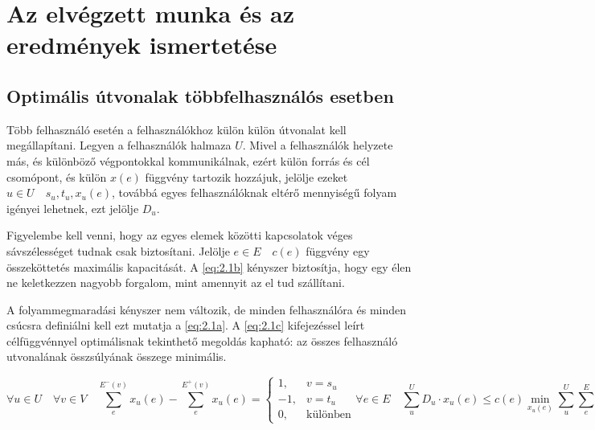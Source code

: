 \documentclass[a4paper,oneside]{article}
\newcommand{\inedge}[1]{E^-(#1)}
\newcommand{\outedge}[1]{E^+(#1)}
\begin{document}
\section{Az elvégzett munka és az eredmények ismertetése}
\label{sec:az-elvegzett-munka}

\subsection{Optimális útvonalak többfelhasználós esetben}
\label{sec:multiuser}

Több felhasználó esetén a felhasználókhoz külön külön útvonalat kell megállapítani.
Legyen a felhasználók halmaza $U$.
Mivel a felhasználók helyzete más, és különböző végpontokkal kommunikálnak, ezért külön forrás és cél csomópont, 
és külön $x(e)$ függvény tartozik hozzájuk, jelölje ezeket $u \in U \quad s_u, t_u, x_u(e)$,
továbbá egyes felhasználóknak eltérő mennyiségű folyam igényei lehetnek, ezt jelölje $D_u$.

Figyelembe kell venni, hogy az egyes elemek közötti kapcsolatok véges sávszélességet tudnak csak biztosítani.
Jelölje $e \in E \quad c(e)$ függvény egy összeköttetés maximális kapacitását.
A \eqref{eq:2.1b} kényszer biztosítja, hogy egy élen ne keletkezzen nagyobb forgalom, mint amennyit az el tud szállítani.

A folyammegmaradási kényszer nem változik, de minden felhasználóra és minden csúcsra definiálni kell ezt mutatja a \eqref{eq:2.1a}.
A \eqref{eq:2.1c} kifejezéssel leírt célfüggvénnyel optimálisnak tekinthető megoldás kapható:
az összes felhasználó utvonalának összsúlyának összege minimális.

\begin{subequations}
  \begin{equation}
    \forall u \in U \quad \forall v \in V \quad \sum_{e}^{\inedge{v}}x_u(e) - \sum_{e}^{\outedge{v}}x_u(e) = \begin{cases}
      1, & v = s_u \\
      -1, & v = t_u\\
      0, & \text{különben}
    \end{cases} \label{eq:2.1a}
  \end{equation}
  \begin{equation}
    \forall e \in E \quad \sum_{u}^{U} D_u \cdot x_u(e) \leq c(e) \label{eq:2.1b}
  \end{equation}
  \begin{equation}
    \min_{x_u(e)} \sum_{u}^{U} \sum_{e}^{E} x_u(e) \, w(e) \label{eq:2.1c}
  \end{equation}
\end{subequations}
\end{document}
